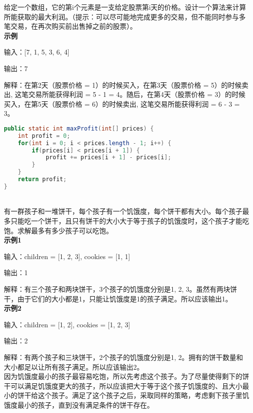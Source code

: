 给定一个数组，它的第i个元素是一支给定股票第i天的价格。设计一个算法来计算所能获取的最大利润。（提示：可以尽可能地完成更多的交易，但不能同时参与多笔交易，在再次购买前出售掉之前的股票）。\\

\textbf{示例}

输入：[7, 1, 5, 3, 6, 4]

输出：7

解释：在第2天（股票价格 = 1）的时候买入，在第3天（股票价格 = 5）的时候卖出, 这笔交易所能获得利润 = 5 - 1 = 4。随后，在第4天（股票价格 = 3）的时候买入，在第5天（股票价格 = 6）的时候卖出, 这笔交易所能获得利润 = 6 - 3 = 3。

\vspace{-0.5cm}

\begin{lstlisting}[language=Java]
public static int maxProfit(int[] prices) {
    int profit = 0;
    for(int i = 0; i < prices.length - 1; i++) {
        if(prices[i] < prices[i + 1]) {
            profit += prices[i + 1] - prices[i];
        }
    }
    return profit;
}
\end{lstlisting}

\vspace{0.5cm}

\\

有一群孩子和一堆饼干，每个孩子有一个饥饿度，每个饼干都有大小。每个孩子最多只能吃一个饼干，且只有饼干的大小大于等于孩子的饥饿度时，这个孩子才能吃饱。求解最多有多少孩子可以吃饱。\\

\textbf{示例1}

输入：children = [1, 2, 3], cookies = [1, 1]

输出：1

解释：有三个孩子和两块饼干，3个孩子的饥饿度分别是1, 2, 3。虽然有两块饼干，由于它们的大小都是1，只能让饥饿度是1的孩子满足。所以应该输出1。\\

\textbf{示例2}

输入：children = [1, 2], cookies = [1, 2, 3]

输出：2

解释：有两个孩子和三块饼干，2个孩子的饥饿度分别是1, 2。拥有的饼干数量和大小都足以让所有孩子满足。所以应该输出2。\\

因为饥饿度最小的孩子最容易吃饱，所以先考虑这个孩子。为了尽量使得剩下的饼干可以满足饥饿度更大的孩子，所以应该把大于等于这个孩子饥饿度的、且大小最小的饼干给这个孩子。满足了这个孩子之后，采取同样的策略，考虑剩下孩子里饥饿度最小的孩子，直到没有满足条件的饼干存在。\\

